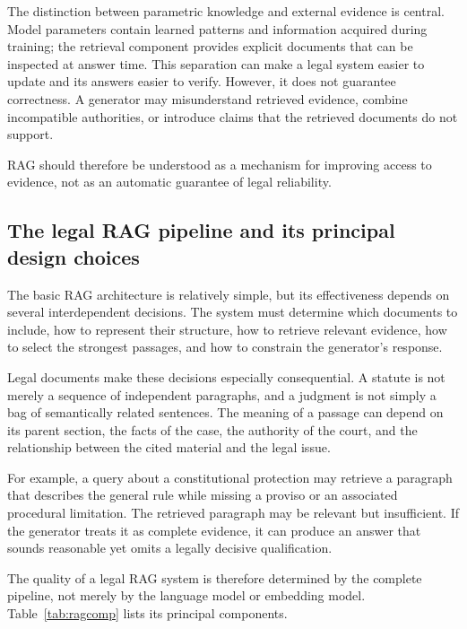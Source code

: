 The distinction between parametric knowledge and external evidence is central. Model parameters
contain learned patterns and information acquired during training; the retrieval component provides
explicit documents that can be inspected at answer time. This separation can make a legal system
easier to update and its answers easier to verify. However, it does not guarantee correctness. A
generator may misunderstand retrieved evidence, combine incompatible authorities, or introduce claims
that the retrieved documents do not support.

RAG should therefore be understood as a mechanism for improving access to evidence, not as an
automatic guarantee of legal reliability.

\subsection{The legal RAG pipeline and its principal design choices}

The basic RAG architecture is relatively simple, but its effectiveness depends on several
interdependent decisions. The system must determine which documents to include, how to represent
their structure, how to retrieve relevant evidence, how to select the strongest passages, and how to
constrain the generator's response.

Legal documents make these decisions especially consequential. A statute is not merely a sequence of
independent paragraphs, and a judgment is not simply a bag of semantically related sentences. The
meaning of a passage can depend on its parent section, the facts of the case, the authority of the
court, and the relationship between the cited material and the legal issue.

For example, a query about a constitutional protection may retrieve a paragraph that describes the
general rule while missing a proviso or an associated procedural limitation. The retrieved paragraph
may be relevant but insufficient. If the generator treats it as complete evidence, it can produce an
answer that sounds reasonable yet omits a legally decisive qualification.

The quality of a legal RAG system is therefore determined by the complete pipeline, not merely by the
language model or embedding model. Table~\ref{tab:ragcomp} lists its principal components.

